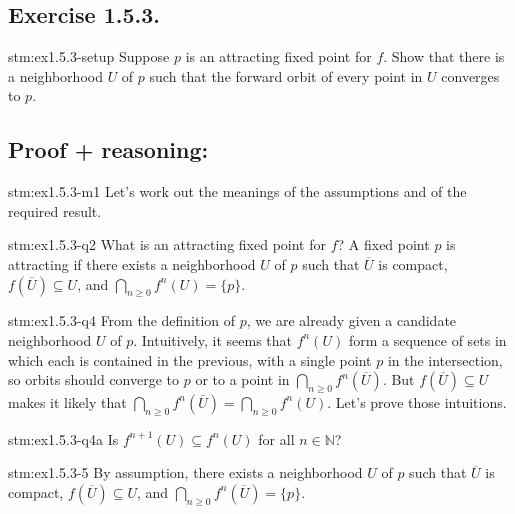 \subsection*{Exercise 1.5.3.}

\begin{exercise}{stm:ex1.5.3-setup}
Suppose $p$ is an attracting fixed point for $f$. Show that there is a neighborhood $U$ of $p$ such that the forward orbit of every point in $U$ converges to $p$.
\end{exercise}

\subsection*{Proof {\color{blue} + reasoning}:}

\begin{explanation}{stm:ex1.5.3-m1}
Let's work out the meanings of the assumptions and of the required result.
\end{explanation}

\begin{explanation}{stm:ex1.5.3-q2}
What is an attracting fixed point for $f$? A fixed point $p$ is attracting if there exists a neighborhood $U$ of $p$ such that $\overline{U}$ is compact, $f(\overline{U}) \subseteq U$, and $\bigcap_{n \ge 0} f^n(U) = \{p\}$.
\end{explanation}

\begin{explanation}{stm:ex1.5.3-q4}
From the definition of $p$, we are already given a candidate neighborhood $U$ of $p$. Intuitively, it seems that $f^n(U)$ form a sequence of sets in which each is contained in the previous, with a single point $p$ in the intersection, so orbits should converge to $p$ or to a point in $\bigcap_{n \ge 0} f^n(\overline{U})$. But $f(\overline{U}) \subseteq U$ makes it likely that $\bigcap_{n \ge 0} f^n(\overline{U}) = \bigcap_{n \ge 0} f^n(U)$. Let's prove those intuitions.
\end{explanation}

\begin{explanation}{stm:ex1.5.3-q4a}
Is $f^{n+1}(U) \subseteq f^n(U)$ for all $n \in \mathbb{N}$?
\end{explanation}

\begin{statement}{stm:ex1.5.3-5}
By assumption, there exists a neighborhood $U$ of $p$ such that $\overline{U}$ is compact, $f(\overline{U}) \subseteq U$, and $\bigcap_{n \ge 0} f^n(\overline{U}) = \{p\}$.
\end{statement}


